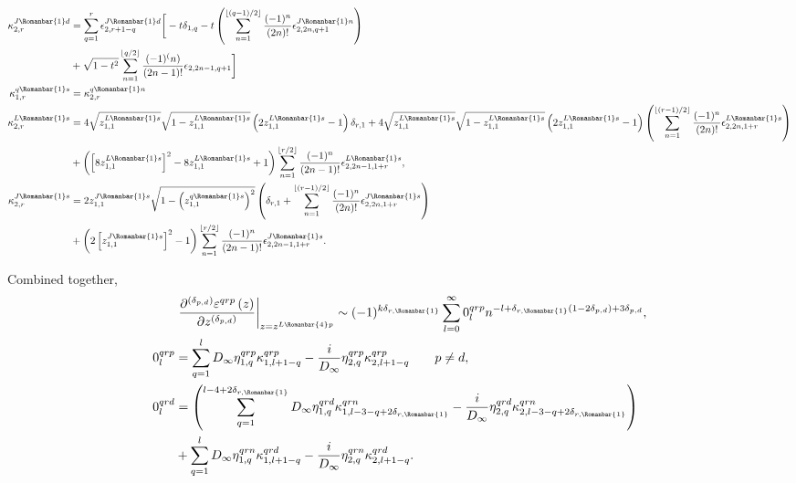 \documentclass[11pt]{article}
\newcommand{\qg}{q}
\newcommand{\ql}{L}
\newcommand{\qj}{J}
\newcommand{\rg}{r}
\newcommand{\rb}{{\scriptsize \Romanbar{1}} }
\newcommand{\rl}{{\scriptsize \Romanbar{4}} }
\newcommand{\pg}{p}
\newcommand{\pn}{n}
\newcommand{\pd}{d}
\newcommand{\ps}{s}
\numberwithin{equation}{section}
\begin{document}
\begin{align}
	\kappa_{2, r}^{\qj\rb\pd} & = \sum_{q=1}^r \epsilon_{2,r+1-q}^{\qj\rb\pd} \bigg[-t\delta_{1,q} -t\left(\sum_{n=1}^{\lfloor (q-1)/2 \rfloor} \frac{(-1)^n}{(2n)!} \epsilon_{2,2n,q+1}^{\qj\rb\pn} \right) \\
	&  +\sqrt{1-t^2}\sum_{n=1}^{\lfloor q/2 \rfloor} \frac{(-1)^(n)}{(2n-1)!} \epsilon_{2,2n-1,q+1} \bigg] \\ %
	\kappa_{1,r}^{\qg\rb\ps} & = \kappa_{2,r}^{\qg\rb\pn} \\ %
	\kappa_{2,r}^{\ql\rb\ps} & = 4\sqrt{z_{1,1}^{\ql\rb\ps}}\sqrt{1-z_{1,1}^{\ql\rb\ps}} \left(2z_{1,1}^{\ql\rb\ps} -1\right) \delta_{r,1} + 4\sqrt{z_{1,1}^{\ql\rb\ps}}\sqrt{1-z_{1,1}^{\ql\rb\ps} } \left(2z_{1,1}^{\ql\rb\ps} -1\right) \left(\sum_{n=1}^{\lfloor (r-1)/2 \rfloor} \frac{(-1)^n }{(2n)!} \epsilon_{2, 2n, 1+r}^{\ql\rb\ps} \right) \\ 
	& + \left(\left[8z_{1,1}^{\ql\rb\ps}\right]^2 -8z_{1,1}^{\ql\rb\ps} +1\right) \sum_{n=1}^{\lfloor r/2 \rfloor} \frac{(-1)^{n} }{(2n-1)!} \epsilon_{2, 2n-1, 1+r}^{\ql\rb\ps}, \\ %
	\kappa_{2,r}^{\qj\rb\ps} & = 2 z_{1,1}^{\qj\rb\ps} \sqrt{1 -\left(z_{1,1}^{\qg\rb\ps}\right)^2 } \left( \delta_{r,1} + \sum_{n=1}^{\lfloor (r-1)/2 \rfloor} \frac{(-1)^n }{(2n)!} \epsilon_{2, 2n, 1+r}^{\qj\rb\ps} \right) \\ 
	& + \left(2\left[z_{1,1}^{\qj\rb\ps}\right]^2 -1\right) \sum_{n=1}^{\lfloor r/2 \rfloor} \frac{(-1)^{n} }{(2n-1)!} \epsilon_{2, 2n-1, 1+r}^{\qj\rb\ps}.
\end{align}

Combined together,
\begin{align}
	& \left. \frac{\partial^{(\delta_{\pg,\pd})} \varepsilon^{\qg\rg\pg}\left(z\right) }{\partial z^{(\delta_{\pg,\pd})}} \right|_{z =z^{\ql\rl\pg}} \sim (-1)^{k\delta_{\rg,\rb} } \sum_{l=0}^\infty 0_l^{\qg\rg\pg} n^{-l + \delta_{\rg,\rb}\left(1 -2\delta_{\pg,\pd}\right) + 3\delta_{\pg,\pd} }, \\
	0_l^{\qg\rg\pg} & = \sum_{q=1}^{l} D_\infty \eta_{1,q}^{\qg\rg\pg} \kappa_{1,l+1-q}^{\qg\rg\pg} - \frac{i}{D_\infty} \eta_{2,q}^{\qg\rg\pg} \kappa_{2,l+1-q}^{\qg\rg\pg} \qquad \pg \neq \pd, \\ 
	0_l^{\qg\rg\pd} & = \left(\sum_{q=1}^{l-4 +2\delta_{\rg,\rb} } D_\infty \eta_{1,q}^{\qg\rg\pd} \kappa_{1,l-3-q+2\delta_{\rg,\rb}}^{\qg\rg\pn} -\frac{i}{D_\infty} \eta_{2,q}^{\qg\rg\pd} \kappa_{2,l-3-q+2\delta_{\rg,\rb}}^{\qg\rg\pn} \right) \\
	& + \sum_{q=1}^{l} D_\infty \eta_{1,q}^{\qg\rg\pn} \kappa_{1,l+1-q}^{\qg\rg\pd} -\frac{i}{D_\infty} \eta_{2,q}^{\qg\rg\pn} \kappa_{2,l+1-q}^{\qg\rg\pd}.
\end{align}
\end{document}
